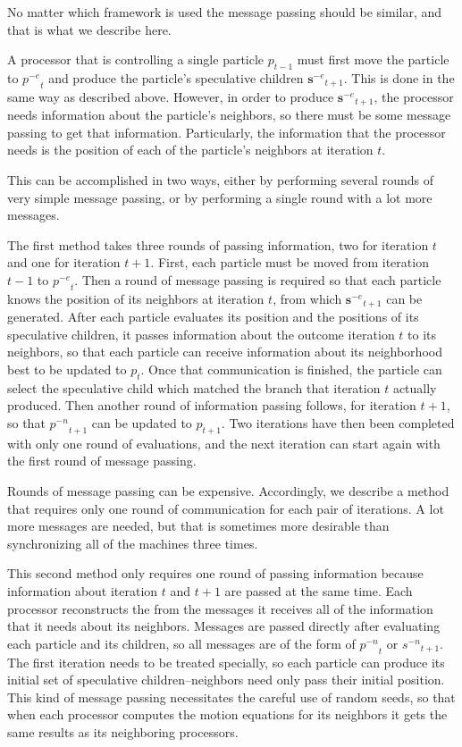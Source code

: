 \documentclass[conference,letterpaper]{IEEEtran}
\providecommand{\noeval}[1]{\ensuremath{#1^{-e}}}
\providecommand{\nonbest}[1]{\ensuremath{#1^{-n}}}
\providecommand{\p}{\ensuremath{p}}
\providecommand{\s}{\ensuremath{s}}
\providecommand{\sset}{\ensuremath{\mathbf{s}}}
\begin{document}
No matter which framework is used the message passing should be similar, and
that is what we describe here.

A processor that is controlling a single particle $\p_{t-1}$ must first move
the particle to $\noeval{\p}_t$ and produce the particle's speculative children
$\noeval{\sset}_{t+1}$.  This is done in the same way as described above.
However, in order to produce $\noeval{\sset}_{t+1}$, the processor needs
information about the particle's neighbors, so there must be some message
passing to get that information.  Particularly, the information that the
processor needs is the position of each of the particle's neighbors at
iteration $t$.

This can be accomplished in two ways, either by performing several rounds of
very simple message passing, or by performing a single round with a lot more
messages.

The first method takes three rounds of passing information, two for iteration
$t$ and one for iteration $t+1$.  First, each particle must be moved from
iteration $t-1$ to $\noeval{\p}_t$.  Then a round of message passing is
required so that each particle knows the position of its neighbors at iteration
$t$, from which $\noeval{\sset}_{t+1}$ can be generated.  After each particle
evaluates its position and the positions of its speculative children, it passes
information about the outcome iteration $t$ to its neighbors, so that each
particle can receive information about its neighborhood best to be updated to
$\p_t$.  Once that communication is finished, the particle can select the
speculative child which matched the branch that iteration $t$ actually
produced.  Then another round of information passing follows, for iteration
$t+1$, so that $\nonbest{\p}_{t+1}$ can be updated to $\p_{t+1}$.  Two
iterations have then been completed with only one round of evaluations, and the
next iteration can start again with the first round of message passing.

Rounds of message passing can be expensive.  Accordingly, we describe a method
that requires only one round of communication for each pair of iterations.  A
lot more messages are needed, but that is sometimes more desirable than
synchronizing all of the machines three times.

This second method only requires one round of passing information because
information about iteration $t$ and $t+1$ are passed at the same time.  Each
processor reconstructs the from the messages it receives all of the information
that it needs about its neighbors.  Messages are passed directly after
evaluating each particle and its children, so all messages are of the form of
$\nonbest{\p}_t$ or $\nonbest{\s}_{t+1}$.  The first iteration needs to be
treated specially, so each particle can produce its initial set of speculative
children--neighbors need only pass their initial position.  This kind of
message passing necessitates the careful use of random seeds, so that when each
processor computes the motion equations for its neighbors it gets the same
results as its neighboring processors.
\end{document}
